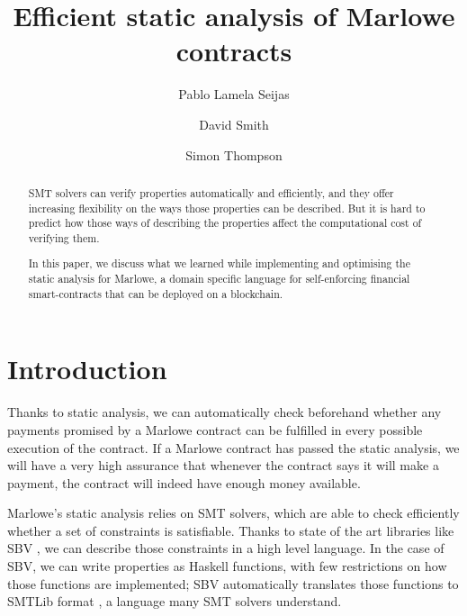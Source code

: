 \documentclass[english,runningheads]{llncs}
\begin{document}
\title{Efficient static analysis of Marlowe contracts}

\author{Pablo {Lamela Seijas} \and
        David Smith \and
        Simon Thompson}



\maketitle
\begin{abstract}
SMT solvers can verify properties automatically and efficiently, and they offer increasing
flexibility on the ways those properties can be described. But it is hard to predict how those ways of describing the properties affect the computational cost of verifying them.

In this paper, we discuss what we learned while implementing and optimising the static analysis for Marlowe, a domain specific language for self-enforcing financial smart-contracts that can be deployed on a blockchain.
\end{abstract}
\section{Introduction\label{sec:Introduction}}

Thanks to static analysis, we can automatically check beforehand whether any
payments promised by a Marlowe contract can be fulfilled in every
possible execution of the contract. If a Marlowe contract has passed
the static analysis, we will have a very high assurance
that whenever the contract says it will make a payment, the contract will
indeed have enough money available.

Marlowe's static analysis relies on SMT solvers, which are able to check efficiently
whether a set of constraints is satisfiable. Thanks to state of the art
libraries like SBV \cite{erkok2019sbv}, we can describe those constraints in a
high level language. In the case of SBV, we can write properties as
Haskell functions, with few restrictions on how those functions are
implemented; SBV automatically translates those functions to SMTLib format \cite{barrett2010smt}, a language many SMT solvers understand.
\end{document}
